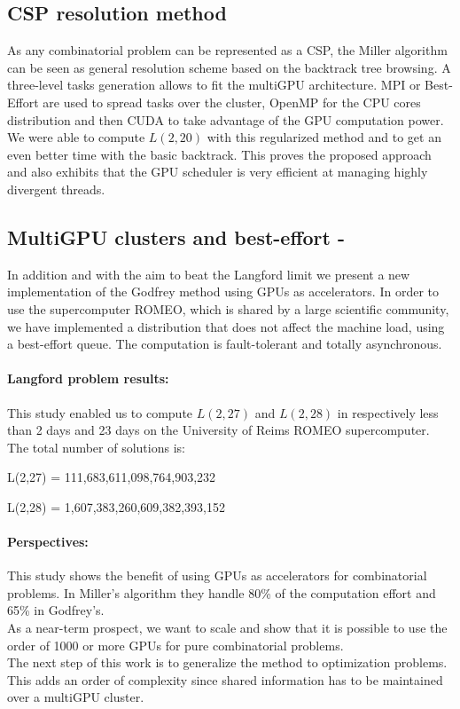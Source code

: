 \subsection{CSP resolution method}
As any combinatorial problem can be represented as a CSP, the Miller algorithm can be seen as general resolution scheme based on the backtrack tree browsing. 
A three-level tasks generation allows to fit the multiGPU architecture. 
MPI or Best-Effort are used to spread tasks over the cluster, OpenMP for the CPU cores distribution and then CUDA to take advantage of the GPU computation power.
We were able to compute $L(2,20)$ with this regularized method and to get an even better time with the basic backtrack. 
This proves the proposed approach and also exhibits that the GPU scheduler is very efficient at managing highly divergent threads.

\subsection{MultiGPU clusters and best-effort -}
In addition and with the aim to beat the Langford limit we present a new implementation of the Godfrey method using GPUs as accelerators. In order to use the supercomputer ROMEO, which is shared by a large scientific community, we have implemented a distribution that does not affect the machine load, using a best-effort queue. The computation is fault-tolerant and totally asynchronous.

\paragraph{Langford problem results: }
This study enabled us to compute $L(2,27)$ and $L(2,28)$ in respectively less than 2 days and 23 days on the University of Reims ROMEO supercomputer. The total number of solutions is: 

\hspace{3cm} L(2,27) = 111,683,611,098,764,903,232

\hspace{3cm} L(2,28) = 1,607,383,260,609,382,393,152

\paragraph{Perspectives: }
This study shows the benefit of using GPUs as accelerators for combinatorial problems. 
In Miller's algorithm they handle 80\% of the computation effort and 65\% in Godfrey's.\\
As a near-term prospect, we want to scale and show that it is possible to use the order of 1000 or more GPUs for pure combinatorial problems.\\
The next step of this work is to generalize the method to optimization problems. This adds an order of complexity since shared information has to be maintained over a multiGPU cluster. 

 
